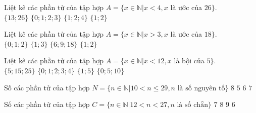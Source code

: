 \begin{ex}
 Liệt kê các phần tử của tập hợp $A=\{x\in \mathbb{N}|x <4, x$ là ước của $26\}$. \\ 
\choice
{ $\{13; 26\}$ }
   { $\{0; 1; 2; 3\}$ }
     { $\{1; 2; 4\}$ }
    { \True $\{1; 2\}$ }
\loigiai{ 
  
 }\end{ex}

\begin{ex}
 Liệt kê các phần tử của tập hợp $A=\{x\in \mathbb{N}|x >3, x$ là ước của $18\}$. \\ 
\choice
{ $\{0; 1; 2\}$ }
   { $\{1; 3\}$ }
     { \True $\{6; 9; 18\}$ }
    { $\{1; 2\}$ }
\loigiai{ 
  
 }\end{ex}

\begin{ex}
 Liệt kê các phần tử của tập hợp $A=\{x\in \mathbb{N}|x< 12, x$ là bội của $5\}$. \\ 
\choice
{ $\{5; 15; 25\}$ }
   { $\{0; 1; 2; 3; 4\}$ }
     { $\{1; 5\}$ }
    { \True $\{0; 5; 10\}$ }
\loigiai{ 
  
 }\end{ex}

\begin{ex}
 Số các phần tử của tập hợp $N=\{n\in \mathbb{N}| 10< n \le 29, n \text{ là số nguyên tố} \}$ 
\choice
{ ${8}$ }
   { ${5}$ }
     { \True ${6}$ }
    { ${7}$ }
\end{ex}

\begin{ex}
 Số các phần tử của tập hợp $C=\{n\in \mathbb{N}| 12< n < 27, n \text{ là số chẵn} \}$ 
\choice
{ \True ${7}$ }
   { ${8}$ }
     { ${9}$ }
    { ${6}$ }
\end{ex}

